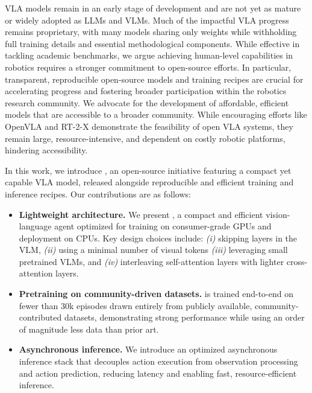 VLA models remain in an early stage of development and are not yet as mature or widely adopted as LLMs and VLMs. Much of the impactful VLA progress remains proprietary, with many models sharing only weights while withholding full training details and essential methodological components.
While effective in tackling academic benchmarks, we argue achieving human-level capabilities in robotics requires a stronger commitment to open-source efforts. In particular, transparent, reproducible open-source models and training recipes are crucial for accelerating progress and fostering broader participation within the robotics research community.
We advocate for the development of affordable, efficient models that are accessible to a broader community. 
While encouraging efforts like OpenVLA \citep{kimopenvla} and RT-2-X \citep{o2024openrtx} demonstrate the feasibility of open VLA systems, they remain large, resource-intensive, and dependent on costly robotic platforms, hindering accessibility.

In this work, we introduce \ours, an open-source initiative featuring a compact yet capable VLA model, released alongside reproducible and efficient training and inference recipes.
Our contributions are as follows:
\begin{itemize}
    \item \textbf{Lightweight architecture.} We present \ours, a compact and efficient vision-language agent optimized for training on consumer-grade GPUs and deployment on CPUs. Key design choices include: \emph{(i)} skipping layers in the VLM, \emph{(ii)} using a minimal number of visual tokens \emph{(iii)} leveraging small pretrained VLMs, and \emph{(iv)} interleaving self-attention layers with lighter cross-attention layers.
    \item \textbf{Pretraining on community-driven datasets.} \ours is trained end-to-end on fewer than 30k episodes drawn entirely from publicly available, community-contributed datasets, demonstrating strong performance while using an order of magnitude less data than prior art.
    \item \textbf{Asynchronous inference.} We introduce an optimized asynchronous inference stack that decouples action execution from observation processing and action prediction, reducing latency and enabling fast, resource-efficient inference.
\end{itemize}



